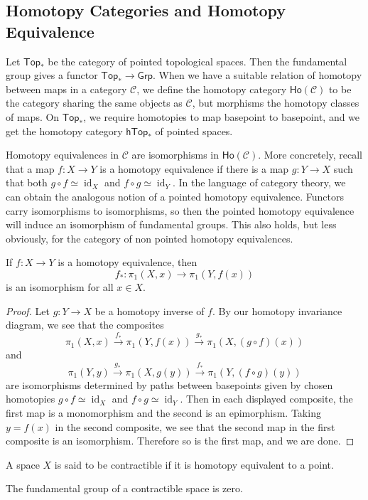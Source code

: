 \subsection{Homotopy Categories and Homotopy Equivalence}
Let $\mathsf{Top}_*$ be the category of pointed topological spaces. Then the fundamental group gives a functor $\mathsf{Top} _* \to \mathsf{Grp} $. When we have a suitable relation of homotopy between maps in a category $\mathcal{C} $, we define the homotopy category $\mathsf{Ho} (\mathcal{C} )$ to be the category sharing the same objects as $\mathcal{C} $, but morphisms the homotopy classes of maps. On $\mathsf{Top} _*$, we require homotopies to map basepoint to basepoint, and we get the homotopy category $\mathsf{hTop}_* $ of pointed spaces.

Homotopy equivalences in $\mathcal{C} $ are isomorphisms in $\mathsf{Ho} (\mathcal{C} )$. More concretely, recall that a map $f \colon X \to Y$ is a homotopy equivalence if there is a map $g \colon Y \to X$ such that both $g\circ f \simeq \operatorname{id}_X$ and $f\circ g \simeq \operatorname{id}_Y$. In the language of category theory, we can obtain the analogous notion of a pointed homotopy equivalence. Functors carry isomorphisms to isomorphisms, so then the pointed homotopy equivalence will induce an isomorphism of fundamental groups. This also holds, but less obviously, for the category of non pointed homotopy equivalences.
\begin{theorem}
    If $f \colon X \to Y$ is a homotopy equivalence, then \[
        f_* \colon \pi_1(X,x) \to \pi_1(Y,f(x))
    \] is an isomorphism for all $x\in X$.
\end{theorem}
\begin{proof}
    Let $g \colon Y \to X$ be a homotopy inverse of $f$. By our homotopy invariance diagram, we see that the composites \[
        \pi_1(X,x)\overset{f_*}{\longrightarrow }\pi_1(Y,f(x))\overset{g_*}{\longrightarrow}\pi_1(X,(g\circ f)(x))
    \] and \[
    \pi_1(Y,y)\overset{g_*}{\longrightarrow}\pi_1(X,g(y))\overset{f_*}{\longrightarrow}\pi_1(Y,(f\circ g)(y))
\] are isomorphisms determined by paths between basepoints given by chosen homotopies $g\circ f \simeq \operatorname{id}_X$ and $f\circ g \simeq \operatorname{id}_Y$. Then in each displayed composite, the first map is a monomorphism and the second is an epimorphism. Taking $y=f(x)$ in the second composite, we see that the second map in the first composite is an isomorphism. Therefore so is the first map, and we are done.
\end{proof}
A space $X$ is said to be contractible if it is homotopy equivalent to a point.
\begin{cor}
    The fundamental group of a contractible space is zero.
\end{cor}

